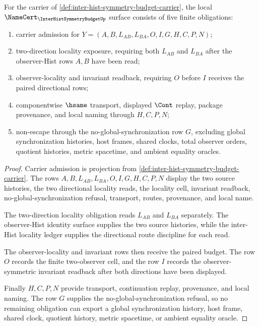 \begin{theorem}
\label{thm:inter-hist-symmetry-budget-namecert-obligations}
For the carrier of \autoref{def:inter-hist-symmetry-budget-carrier}, the local $\NameCert_{\InterHistSymmetryBudgetUp}$ surface consists of five finite obligations:
\begin{enumerate}
\item carrier admission for $Y=(A,B,L_{AB},L_{BA},O,I,G,H,C,P,N)$;
\item two-direction locality exposure, requiring both $L_{AB}$ and $L_{BA}$ after the observer-Hist rows $A,B$ have been read;
\item observer-locality and invariant readback, requiring $O$ before $I$ receives the paired directional rows;
\item componentwise $\hsame$ transport, displayed $\Cont$ replay, package provenance, and local naming through $H,C,P,N$;
\item non-escape through the no-global-synchronization row $G$, excluding global synchronization histories, host frames, shared clocks, total observer orders, quotient histories, metric spacetime, and ambient equality oracles.
\end{enumerate}
\end{theorem}
\begin{proof}
Carrier admission is projection from \autoref{def:inter-hist-symmetry-budget-carrier}. The rows $A,B,L_{AB},L_{BA},O,I,G,H,C,P,N$ display the two source histories, the two directional locality reads, the locality cell, invariant readback, no-global-synchronization refusal, transport, routes, provenance, and local name.

The two-direction locality obligation reads $L_{AB}$ and $L_{BA}$ separately. The observer-Hist identity surface supplies the two source histories, while the inter-Hist locality ledger supplies the directional route discipline for each read.

The observer-locality and invariant rows then receive the paired budget. The row $O$ records the finite two-observer cell, and the row $I$ records the observer-symmetric invariant readback after both directions have been displayed.

Finally $H,C,P,N$ provide transport, continuation replay, provenance, and local naming. The row $G$ supplies the no-global-synchronization refusal, so no remaining obligation can export a global synchronization history, host frame, shared clock, quotient history, metric spacetime, or ambient equality oracle.
\end{proof}

